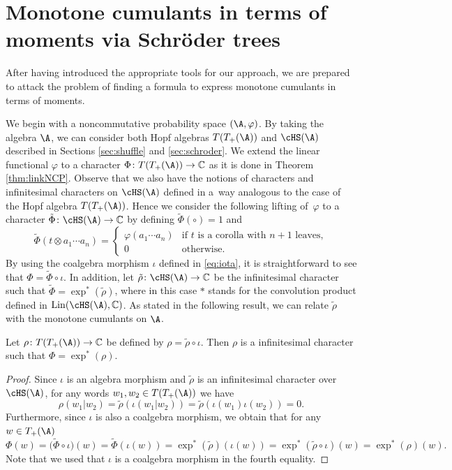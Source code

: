 \section{Monotone cumulants in terms of moments via Schr\"oder trees}\label{sec:monotone}

After having introduced the appropriate tools for our approach, we are prepared to attack the problem of finding a formula to express monotone cumulants in terms of moments.

 We begin with a noncommutative probability space $(\A,\varphi)$. By taking the algebra $\A$, we can consider both Hopf algebras $T(T_+(\A))$ and $\cHS(\A)$ described in Sections \ref{sec:shuffle} and \ref{sec:schroder}. We extend the linear functional $\varphi$ to a character $\Phi\colon T(T_+(\A))\to\mathbb{C}$ as it is done in Theorem \ref{thm:linkNCP}. Observe that we also have the notions of characters and infinitesimal characters on $\cHS(\A)$ defined in a~way analogous to the case of the Hopf algebra $T(T_+(\A))$. Hence we consider the following lifting of~$\varphi$ to a character $\tilde\Phi\colon \cHS(\A)\to\mathbb{C}$ by defining $\tilde\Phi(\circ) =1$ and
\begin{equation}
\label{eq:tildephi}
	\tilde\Phi(t \otimes a_1\cdots a_n)
	= \begin{cases} \varphi(a_1\cdots a_n) & \text{if $t$ is a corolla with $n+1$ leaves},\\ 0& \text{otherwise}. \end{cases}
\end{equation}
By using the coalgebra morphism $\iota$ defined in \eqref{eq:iota}, it is straightforward to see that $\Phi = \tilde\Phi \circ \iota.$ In addition, let $\tilde \rho\colon \cHS(\A)\to\mathbb{C}$ be the infinitesimal character such that $\tilde\Phi = \exp^*(\tilde\rho)$, where in this case $*$ stands for the convolution product defined in $\operatorname{Lin}(\cHS(\A),\mathbb{C})$. As stated in the following result, we can relate $\tilde\rho$ with the monotone cumulants on $\A$.

\begin{Proposition}\label{prop:easy}
Let $\rho\colon T(T_+(\A))\to\mathbb{C}$ be defined by $\rho = \tilde\rho\circ\iota$. Then $\rho$ is a infinitesimal character such that $\Phi = \exp^*(\rho).$
\end{Proposition}

\begin{proof}Since $\iota$ is an algebra morphism and $\tilde\rho$ is an infinitesimal character over $\cHS(\A)$, for any words $w_1,w_2\in T(T_+(\A))$ we have
\[
	\rho(w_1|w_2) = \tilde\rho(\iota(w_1|w_2)) = \tilde\rho(\iota(w_1)\iota(w_2)) = 0.
\]
Furthermore, since $\iota$ is also a coalgebra morphism, we obtain that for any $w\in T_+(\A)$
\[
	\Phi(w) = \big(\tilde\Phi \circ\iota\big)(w)
	= \tilde\Phi(\iota(w))
	= \exp^*(\tilde \rho)(\iota(w)) = \exp^*(\tilde\rho\circ\iota)(w)
	= \exp^*(\rho)(w).
\]
Note that we used that $\iota$ is a coalgebra morphism in the fourth equality.
\end{proof}

